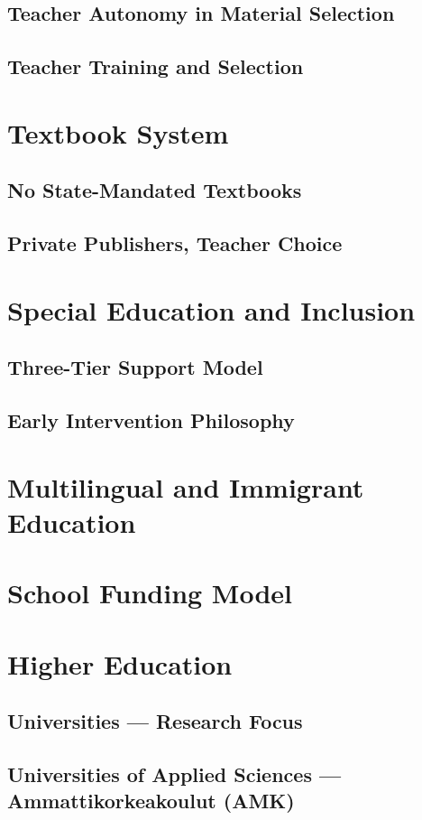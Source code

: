 \subsection{Teacher Autonomy in Material Selection}
\subsection{Teacher Training and Selection}

\section{Textbook System}
\subsection{No State-Mandated Textbooks}
\subsection{Private Publishers, Teacher Choice}

\section{Special Education and Inclusion}
\subsection{Three-Tier Support Model}
\subsection{Early Intervention Philosophy}

\section{Multilingual and Immigrant Education}
\section{School Funding Model}

\section{Higher Education}
\subsection{Universities --- Research Focus}
\subsection{Universities of Applied Sciences --- Ammattikorkeakoulut (AMK)}
